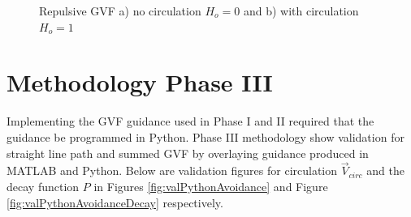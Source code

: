\documentclass[numbered,pdftex]{ohio-etd}
\begin{document}
\begin{figure}[H]
	\begin{subfigmatrix}{2}%
		\centering	
		\hspace*{0mm}
	\end{subfigmatrix}
	\caption{Repulsive GVF a) no circulation $H_o=0$ and b) with circulation $H_o=1$}
	\label{fig:decayApplied}
\end{figure} 


\chapter{Methodology Phase III}

Implementing the GVF guidance used in Phase I and II required that the guidance be programmed in Python. Phase III methodology show validation for straight line path and summed GVF by overlaying guidance produced in MATLAB and Python. Below are validation figures for circulation $\overrightarrow{V}_{circ}$ and the decay function $P$ in Figures \ref{fig:valPythonAvoidance} and Figure \ref{fig:valPythonAvoidanceDecay} respectively.
\end{document}
